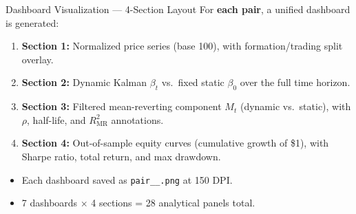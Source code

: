 \documentclass[10pt, aspectratio=169]{beamer}
\begin{document}
\begin{frame}{Dashboard Visualization --- 4-Section Layout}
  For \textbf{each pair}, a unified dashboard is generated:
  \vspace{4pt}
  \begin{enumerate}
    \item \textbf{Section 1:} Normalized price series (base 100), with
          formation/trading split overlay.
    \item \textbf{Section 2:} Dynamic Kalman $\beta_t$ vs.\ fixed static
          $\beta_0$ over the full time horizon.
    \item \textbf{Section 3:} Filtered mean-reverting component $M_t$
          (dynamic vs.\ static), with $\rho$, half-life, and $R^2_{\text{MR}}$
          annotations.
    \item \textbf{Section 4:} Out-of-sample equity curves (cumulative growth
          of \$1), with Sharpe ratio, total return, and max drawdown.
  \end{enumerate}
  \vspace{6pt}
  \begin{itemize}
    \item Each dashboard saved as \texttt{pair\_<T1>\_<T2>.png}
          at 150 DPI.
    \item 7 dashboards $\times$ 4 sections = 28 analytical panels total.
  \end{itemize}
\end{frame}
\end{document}
